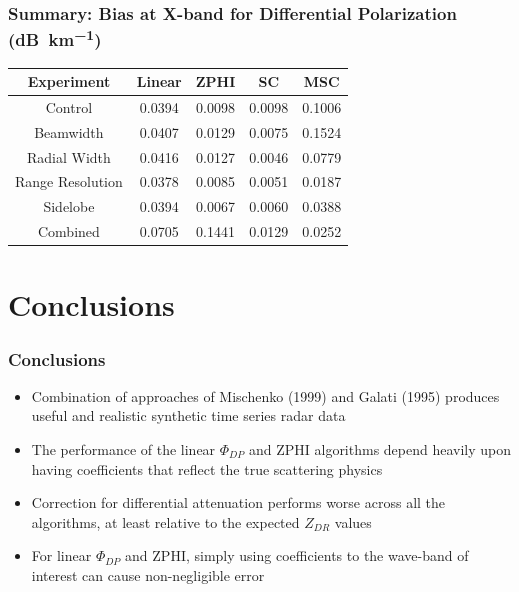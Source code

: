 \documentclass[red]{beamer}
\begin{document}
\begin{frame}
    \frametitle{Summary: Bias at X-band for Differential Polarization (\si{dB\per \kilo\meter})}
    \begin{center}
        \begin{tabular}{| c | c | c | c | c |}
            \hline
            Experiment & Linear & ZPHI & SC & MSC \\
            \hline
            \hline
            Control & 0.0394 & 0.0098 & 0.0098 & 0.1006 \\
            Beamwidth & 0.0407 & 0.0129 & 0.0075 & 0.1524 \\
            Radial Width & 0.0416 & 0.0127 & 0.0046 & 0.0779 \\
            Range Resolution & 0.0378 & 0.0085 & 0.0051 & 0.0187 \\
            Sidelobe & 0.0394 & 0.0067 & 0.0060 & 0.0388 \\
            Combined & 0.0705 & 0.1441 & 0.0129 & 0.0252 \\
            \hline
        \end{tabular}
    \end{center}
\end{frame}

\section{Conclusions}
\begin{frame}[<+->]
	\frametitle{Conclusions}
	\begin{itemize}
		\item Combination of approaches of Mischenko (1999) and Galati (1995)
		produces useful and realistic synthetic time series radar data
		\item The performance of the linear $\Phi_{DP}$ and ZPHI algorithms depend heavily upon having coefficients
		that reflect the true scattering physics
		\item Correction for differential attenuation performs worse across all the algorithms, at least relative to the expected $Z_{DR}$ values
		\item For linear $\Phi_{DP}$ and ZPHI, simply using coefficients to the wave-band of interest can cause non-negligible error
	\end{itemize}
\end{frame}
\end{document}
